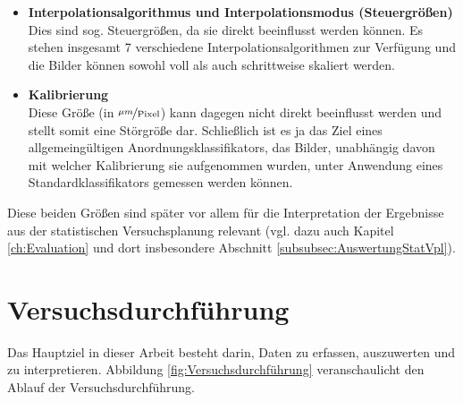 \documentclass[
fontsize=10pt, 
listof = totoc,
parskip = half	
]{report}
\begin{document}
\begin{itemize}
	\item \textbf{Interpolationsalgorithmus und Interpolationsmodus (Steuergrößen)} \\
	Dies sind sog. Steuergrößen, da sie direkt beeinflusst werden können. Es stehen insgesamt 7 verschiedene Interpolationsalgorithmen zur Verfügung und die Bilder können sowohl voll als auch schrittweise skaliert werden.
	\item \textbf{Kalibrierung} \\
	Diese Größe (in $\nicefrac{\mu m}{\text{Pixel}}$) kann dagegen nicht direkt beeinflusst werden und stellt somit eine Störgröße dar. Schließlich ist es ja das Ziel eines allgemeingültigen Anordnungsklassifikators, das Bilder, unabhängig davon mit welcher Kalibrierung sie aufgenommen wurden, unter Anwendung eines Standardklassifikators gemessen werden können.
\end{itemize}

\noindent Diese beiden Größen sind später vor allem für die Interpretation der Ergebnisse aus der statistischen Versuchsplanung relevant (vgl. dazu auch Kapitel \ref{ch:Evaluation} und dort insbesondere Abschnitt \ref{subsubsec:AuswertungStatVpl}).

\section{Versuchsdurchführung}

Das Hauptziel in dieser Arbeit besteht darin, Daten zu erfassen, auszuwerten und zu interpretieren. Abbildung \ref{fig:Versuchsdurchführung} veranschaulicht den Ablauf der Versuchsdurchführung.
\end{document}
